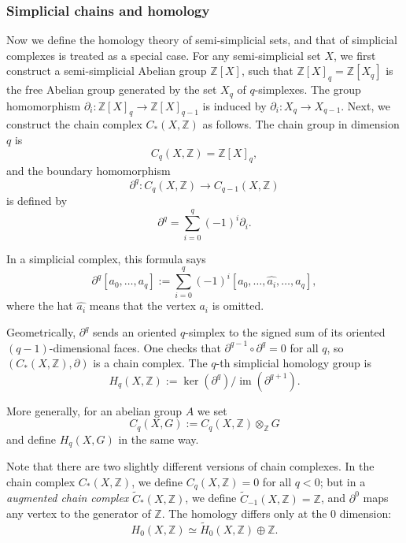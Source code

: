 \documentclass[reprint, amsmath, amssymb, showpacs, floatfix, longbibliography, aps, twocolumn, superscriptaddress, nofootinbib]{revtex4-2}
\newcommand{\ZZ}{{\mathbb Z}}
\theoremstyle{definition}
\begin{document}
\subsubsection*{Simplicial chains and homology}

Now we define the homology theory of semi-simplicial sets, and that of simplicial complexes is treated as a special case. For any semi-simplicial set $X$, we first construct a semi-simplicial Abelian group $\ZZ[X]$, such that $\ZZ[X]_q=\ZZ[X_q]$ is the free Abelian group generated by the set $X_q$ of $q$-simplexes. The group homomorphism $\partial_i:\ZZ[X]_q\rightarrow \ZZ[X]_{q-1}$ is induced by $\partial_i:X_q\rightarrow X_{q-1}$. Next, we construct the chain complex $C_*(X,\ZZ)$ as follows. The chain group in dimension $q$ is
\[
C_q(X,\ZZ) = \ZZ[X]_q,
\]
and the boundary homomorphism
\[
\partial^q\colon C_q(X,\ZZ) \longrightarrow C_{q-1}(X,\ZZ)
\]
 is defined by
 \begin{equation}
 	\partial^q=\sum_{i=0}^q(-1)^i\partial_i.
 \end{equation}

In a simplicial complex, this formula says
\begin{equation}\label{eqChainBoundary}
	\partial^q [a_0,\dots,a_q]
	:= \sum_{i=0}^q (-1)^i [a_0,\dots,\widehat{a_i},\dots,a_q],
\end{equation}
where the hat $\widehat{a_i}$ means that the vertex $a_i$ is omitted.

Geometrically, $\partial^q$ sends an oriented $q$-simplex to the signed sum of its oriented $(q-1)$-dimensional faces.
One checks that $\partial^{q-1}\circ\partial^q = 0$ for all $q$, so $(C_*(X,\ZZ),\partial)$ is a chain complex.
The $q$-th simplicial homology group is
\[
H_q(X,\ZZ) := \ker(\partial^q)\big/\operatorname{im}(\partial^{q+1}) .
\]

More generally, for an abelian group $A$ we set
\[
C_q(X,G) := C_q(X,\ZZ)\otimes_\ZZ G
\]
and define $H_q(X,G)$ in the same way.  

Note that there are two slightly different versions of chain complexes. In the chain complex $C_*(X,\ZZ)$, we define $C_q(X,\ZZ)=0$ for all $q<0$; but in a \textit{augmented chain complex} $\tilde{C}_*(X,\ZZ)$, we define $\tilde{C}_{-1}(X,\ZZ)=\ZZ$, and $\partial^0$ maps any vertex to the generator of $\ZZ$. The homology differs only at the $0$ dimension:
\begin{equation}
	H_0(X,\ZZ)\simeq \tilde{H}_0(X,\ZZ)\oplus\ZZ.
\end{equation}
\end{document}
